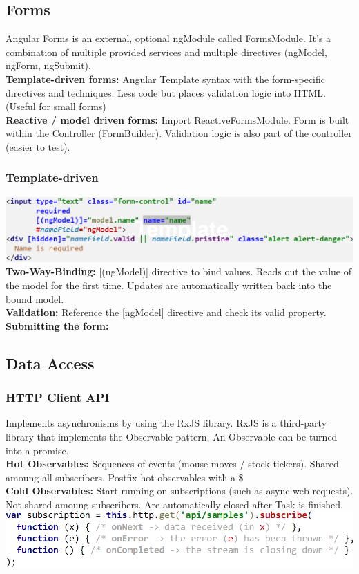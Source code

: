 \subsection{Forms}
Angular Forms is an external, optional ngModule called FormsModule.
It's a combination of multiple provided services and multiple directives (ngModel, ngForm, ngSubmit).\\
\textbf{Template-driven forms:} Angular Template syntax with the form-specific directives and techniques.
Less code but places validation logic into HTML. (Useful for small forms)\\
\textbf{Reactive / model driven forms:} Import ReactiveFormsModule.
Form is built within the Controller (FormBuilder).
Validation logic is also part of the controller (easier to test).

\subsubsection{Template-driven}
\includegraphics[width=\linewidth]{img/angular_forms.png}
\textbf{Two-Way-Binding:} [(ngModel)] directive to bind values.
Reads out the value of the model for the first time.
Updates are automatically written back into the bound model.\\
\textbf{Validation:} Reference the [ngModel] directive and check its valid property.\\
\textbf{Submitting the form:}

\subsection{Data Access}
\subsubsection{HTTP Client API}
Implements asynchronisms by using the RxJS library.
RxJS is a third-party library that implements the Observable pattern.
An Observable can be turned into a promise.\\
\textbf{Hot Observables:} Sequences of events (mouse moves / stock tickers).
Shared amoung all subscribers.
Postfix hot-observables with a \$\\
\textbf{Cold Observables:} Start running on subscriptions (such as async web requests).
Not shared amoung subscribers.
Are automatically closed after Task is finished.\\
\includegraphics[width=0.8\linewidth]{img/angular_observable.png}


